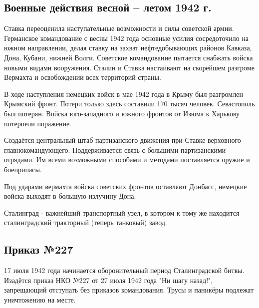 \subsection{Военные действия весной -- летом 1942 г.}

Ставка переоценила наступательные возможности и силы советской армии. Германское командование с весны 1942 года основные усилия сосредоточило на южном направлении, делая ставку на захват нефтедобывающих районов Кавказа, Дона, Кубани, нижней Волги. Советское командование пытается снабжать войска новыми видами вооружения. Сталин и Ставка настаивают на скорейшем разгроме Вермахта и освобождении всех территорий страны.

В ходе наступления немецких войск в мае 1942 года в Крыму был разгромлен Крымский фронт. Потери только здесь составили 170 тысяч человек. Севастополь был потерян. Войска юго-западного и южного фронтов от Изюма к Харькову потерпели поражение.

Создаётся центральный штаб партизанского движения при Ставке верховного главнокомандующего. Поддерживается связь с большими партизанскими отрядами. Им всеми возможными способами и методами поставляется оружие и боеприпасы.

Под ударами вермахта войска советских фронтов оставляют Донбасс, немецкие войска выходят в большую излучину Дона.

Сталинград - важнейший транспортный узел, в котором к тому же находится сталинградский тракторный (теперь танковый) завод.

\subsection{Приказ №227}

17 июля 1942 года начинается оборонительный период Сталинградской битвы. Изадётся приказ НКО №227 от 27 июля 1942 года "Ни шагу назад!", запрещающий отступать без приказов командования. Трусы и паникёры подлежат уничтожению на месте.